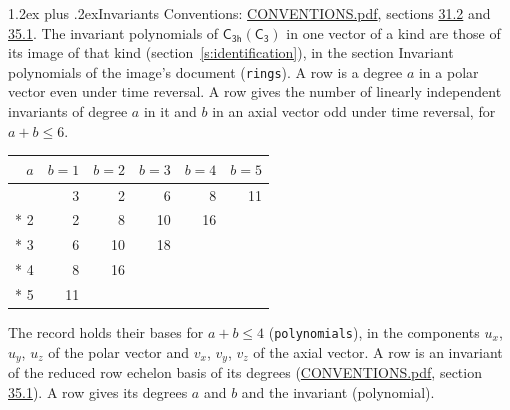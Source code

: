 \documentclass[10pt,a4paper]{article}
\makeatletter
\renewcommand\section{\@startsection{section}{1}{\z@}{-3ex plus -1ex minus -.2ex}%
  {1.2ex plus .2ex}{\normalfont\large\sffamily\bfseries\color{parttitle}}}
\numberwithin{equation}{section}
\newcommand{\grp}[1]{\mathsf{#1}}
\makeatother
\begin{document}
\section{Invariants}\label{s:invariants}
Conventions: \href{../../CONVENTIONS.pdf}{CONVENTIONS.pdf}, sections \href{../../CONVENTIONS.pdf\#conv.31.2}{31.2} and \href{../../CONVENTIONS.pdf\#conv.35.1}{35.1}.
The invariant polynomials of $\grp{C_{3h}}(\grp{C_{3}})$ in one vector of a kind are those of its image of that kind (section~\ref{s:identification}), in the section Invariant polynomials of the image's document (\texttt{rings}).
\leavevmode\label{n:index.degree.polar}\label{n:index.degree.axial}A row is a degree $a$ in a polar vector even under time reversal. A row gives the number of linearly independent invariants of degree $a$ in it and $b$ in an axial vector odd under time reversal, for $a + b \le 6$.
{\small\begin{longtable}{@{}rrrrrr@{}}\toprule
$a$ & $b = 1$ & $b = 2$ & $b = 3$ & $b = 4$ & $b = 5$\\\midrule\endhead
\bottomrule\endfoot\endlastfoot
1 & 3 & 2 & 6 & 8 & 11\\*
2 & 2 & 8 & 10 & 16 & \\*
3 & 6 & 10 & 18 &  & \\*
4 & 8 & 16 &  &  & \\*
5 & 11 &  &  &  & \\
\bottomrule\end{longtable}}
\leavevmode\label{n:local.component.polar}\label{n:local.component.axial}The record holds their bases for $a + b \le 4$ (\texttt{polynomials}), in the components $u_{x}$, $u_{y}$, $u_{z}$ of the polar vector and $v_{x}$, $v_{y}$, $v_{z}$ of the axial vector. \label{n:head.polynomial}A row is an invariant of the reduced row echelon basis of its degrees (\href{../../CONVENTIONS.pdf}{CONVENTIONS.pdf}, section \href{../../CONVENTIONS.pdf\#conv.35.1}{35.1}). A row gives its degrees $a$ and $b$ and the invariant (polynomial).
\end{document}
